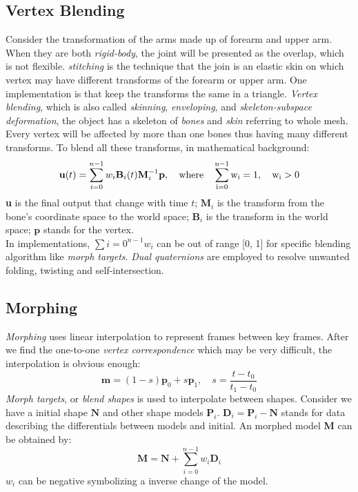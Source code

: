 \documentclass[10pt, a4paper]{article}
\begin{document}
        \subsection{Vertex Blending}
            Consider the transformation of the arms made up of forearm and upper arm. When they are both \emph{rigid-body}, the joint will be presented as the overlap, which is not flexible. \emph{stitching} is the technique that the join is an elastic skin on which vertex may have different transforms of the forearm or upper arm. One implementation is that keep the transforms the same in a triangle. 
            \emph{Vertex blending}, which is also called \emph{skinning}, \emph{enveloping}, and \emph{skeleton-subspace deformation}, the object has a skeleton of \emph{bones} and \emph{skin} referring to whole mesh. Every vertex will be affected by more than one bones thus having many different transforms. To blend all these transforms, in mathematical background:
                $$\textbf{u}(t) = \sum_{i = 0}^{n - 1}w_i\textbf{B}_i(t)\textbf{M}_i^{-1}\textbf{p},\quad \rm{where}\quad \sum_{i = 0}^{n - 1}w_i = 1,\quad w_i > 0$$
            \indent \textbf{u} is the final output that change with time $t$; $\textbf{M}_i$ is the  transform from the bone's coordinate space to the world space; $\textbf{B}_i$ is the transform in the world space; $\textbf{p}$ stands for the vertex.\\
            
            In implementations, $\sum{i = 0}^{n - 1}w_i$ can be out of range [0, 1] for specific blending algorithm like \emph{morph targets}. \emph{Dual quaternions} are employed to resolve unwanted folding, twisting and self-intersection.
        \subsection{Morphing}
            \emph{Morphing} uses linear interpolation to represent frames between key frames. After we find the one-to-one \emph{vertex correspondence} which may be very difficult, the interpolation is obvious enough:
                $$\textbf{m} = (1 - s)\textbf{p}_0 + s\textbf{p}_1,\quad s = \frac{t - t_0}{t_1 - t_0}$$
            \indent \emph{Morph targets}, or \emph{blend shapes} is used to interpolate between shapes. Consider we have a initial shape $\textbf{N}$ and other shape models $\textbf{P}_i$. $\textbf{D}_i = \textbf{P}_i - \textbf{N}$ stands for data describing the differentials between models and initial. An morphed model \textbf{M} can be obtained by: 
                $$\textbf{M} = \textbf{N} + \sum_{i = 0} ^ {n - 1}w_i\textbf{D}_i$$
            \indent $w_i$ can be negative symbolizing a inverse change of the model.
            \newpage
        
\end{document}
